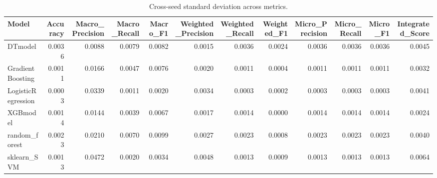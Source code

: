 \begin{table}[t]
\centering
\begin{tabular}{lrrrrrrrrrrr}
\toprule
Model & Accuracy & Macro_Precision & Macro_Recall & Macro_F1 & Weighted_Precision & Weighted_Recall & Weighted_F1 & Micro_Precision & Micro_Recall & Micro_F1 & Integrated_Score \\
\midrule
DTmodel & 0.0036 & 0.0088 & 0.0079 & 0.0082 & 0.0015 & 0.0036 & 0.0024 & 0.0036 & 0.0036 & 0.0036 & 0.0045 \\
GradientBoosting & 0.0011 & 0.0166 & 0.0047 & 0.0076 & 0.0020 & 0.0011 & 0.0004 & 0.0011 & 0.0011 & 0.0011 & 0.0032 \\
LogisticRegression & 0.0003 & 0.0339 & 0.0011 & 0.0020 & 0.0034 & 0.0003 & 0.0002 & 0.0003 & 0.0003 & 0.0003 & 0.0041 \\
XGBmodel & 0.0014 & 0.0144 & 0.0039 & 0.0067 & 0.0017 & 0.0014 & 0.0000 & 0.0014 & 0.0014 & 0.0014 & 0.0024 \\
random_forest & 0.0023 & 0.0210 & 0.0070 & 0.0099 & 0.0027 & 0.0023 & 0.0008 & 0.0023 & 0.0023 & 0.0023 & 0.0040 \\
sklearn_SVM & 0.0013 & 0.0472 & 0.0020 & 0.0034 & 0.0048 & 0.0013 & 0.0009 & 0.0013 & 0.0013 & 0.0013 & 0.0064 \\
\bottomrule
\end{tabular}
\caption{Cross-seed standard deviation across metrics.}
\label{tab:cross_seed_std}
\end{table}